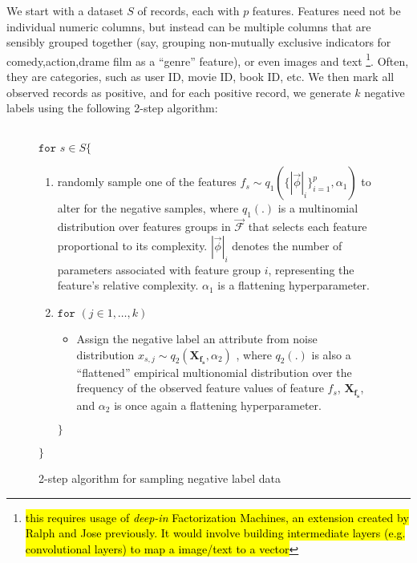 \documentclass{article} %
\newcommand{\vect}[1]{\vec{#1}}
\begin{document}
We start with a dataset $S$ of records, each with $p$ features. Features need not be individual numeric columns, but instead can be multiple columns that are sensibly grouped together (say, grouping non-mutually exclusive indicators for comedy,action,drame film as a ``genre'' feature), or even images and text
\footnote{\hl{this requires usage of \textit{deep-in} Factorization Machines, an extension created by Ralph and Jose previously. It would involve building intermediate layers (e.g. convolutional layers) to map a image/text to a vector}}.
Often, they are categories, such as user ID, movie ID, book ID, etc. We then mark all observed records as positive, and for each positive record, we generate $k$ negative labels using the following 2-step algorithm:
\\ \\
\begin{figure}[h!]
\begin{tcolorbox}
\noindent$\texttt{for }  s \in S \{$
\begin{enumerate}
	\item randomly sample  one of the features	$ f_s \sim q_1(\{|\vec{\phi}|_i\}_{i=1}^p,\alpha_1) $ to alter for the negative samples, where $q_1(.)$ is a multinomial distribution over features groups in $\vect{\mathcal{F}}$ that selects each feature proportional to its complexity.
  $|\vec{\phi}|_i$ denotes the number of parameters associated with feature group $i$, representing the feature's relative complexity.
  $\alpha_1$ is a flattening hyperparameter.
	\item $\texttt{for } (j \in 1,\ldots,k)$
	\begin{itemize}
		\item Assign the negative label an attribute from noise distribution $x_{s,j} \sim q_2(\mathbf{X_{f_s}},\alpha_2)$ , where $q_2(.)$ is also a  ``flattened'' empirical multionomial distribution over the frequency of the observed feature values of feature $f_s$, $\mathbf{X_{f_s}}$, and $\alpha_2$ is once again a flattening hyperparameter.
	\end{itemize}
	$\}$
\end{enumerate}
$\}$
\end{tcolorbox}
\caption{2-step algorithm for sampling negative label data}
\end{figure}
\end{document}
